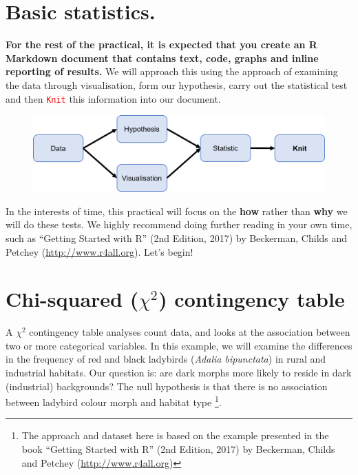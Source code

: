 \documentclass[a4paper,12pt]{article}
\newcommand\code[1]{\textcolor{red}{\texttt{#1}}}
\begin{document}
\section{Basic statistics.}

\textbf{For the rest of the practical, it is expected that you create an R Markdown document that contains text, code, graphs and inline reporting of results.} We will approach this using the  approach of examining the data through visualisation, form our hypothesis, carry out the statistical test and then \code{Knit} this information into our document. \\


\begin{figure}[h]
\centering 
\includegraphics[width=.8\textwidth]{figs/StatisticsFlow2.png}
\label{fig:StatisticsFlow}
\end{figure} 

In the interests of time, this practical will focus on the \textbf{how} rather than \textbf{why} we will do these tests. We highly recommend doing further reading in your own time, such as ``Getting Started with R'' (2nd Edition, 2017) by Beckerman, Childs and Petchey (\url{http://www.r4all.org}). Let's begin!



\section{Chi-squared ($\chi^{2}$) contingency table}

A $\chi ^{2}$ contingency table analyses count data, and looks at the association between two or more categorical variables. In this example, we will examine the differences in the frequency of red and black ladybirds (\textit{Adalia bipunctata}) in rural and industrial habitats. Our question is: are dark morphs more likely to reside in dark (industrial) backgrounds? The null hypothesis is that there is no association between ladybird colour morph and habitat type \footnote{The approach and dataset here is based on the example presented in the book ``Getting Started with R'' (2nd Edition, 2017) by Beckerman, Childs and Petchey (\url{http://www.r4all.org})}. \\
\end{document}
